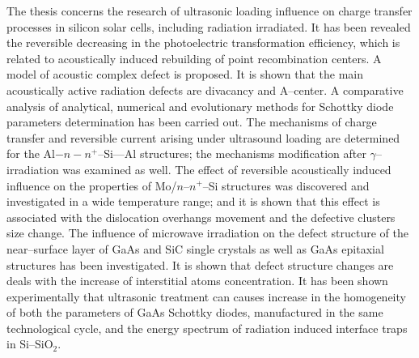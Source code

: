 The thesis concerns the research of ultrasonic loading influence on charge transfer processes in silicon solar cells,
 including radiation irradiated.
 It has been revealed the reversible decreasing in the photoelectric transformation efficiency,
 which is related to acoustically induced rebuilding of point recombination centers.
 A model of acoustic complex defect is proposed.
 It is shown that the main acoustically active radiation defects are divacancy and A--center.
 A comparative analysis of analytical, numerical and evolutionary methods for Schottky diode parameters determination  has been carried out.
 The mechanisms of charge transfer and reversible current arising under ultrasound loading are determined 
 for the Al$-n-n^+$--Si---Al structures;
 the  mechanisms modification after $\gamma$--irradiation was examined as well.
 The effect of reversible acoustically induced influence on the properties of Mo/$n$--$n^{+}$--Si structures  was discovered and investigated in a wide temperature range;
 and it is shown that this effect is associated with the dislocation overhangs movement and the defective clusters size change.
 The influence of microwave irradiation on the defect structure of the near--surface layer of  GaAs and SiC single crystals as well as GaAs epitaxial structures has been investigated.
 It is shown that defect structure changes are deals with the increase of interstitial atoms concentration.
 It has been shown experimentally that ultrasonic treatment can causes increase in the homogeneity of both the parameters of GaAs Schottky diodes, manufactured in
the same technological cycle, and the energy spectrum of radiation induced interface traps in Si--SiO$_2$.


\keywordsEn
